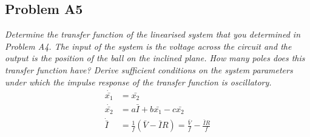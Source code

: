 \subsection*{Problem A5} \emph{Determine the transfer function of the linearised system that you determined in Problem A4. The input of the system is the voltage across the circuit and the output is the position of the ball on the inclined plane. How many poles does this transfer function have? Derive sufficient conditions on the system parameters under which the impulse response of the transfer function is oscillatory.}
    \begin{align}\nonumber
        \dot{\bar{x_1}} &= \bar{x_2}\\ \nonumber
        \dot{\bar{x_2}} &= a\bar{I} + b\bar{x_1} - c\bar{x_2}\\ \nonumber
        \dot{\bar{I}} &= \frac{1}{f}(\bar{V}-\bar{I}R)=\frac{\bar{V}}{f} - \frac{\bar{I}R}{f}\\ \nonumber
    \end{align}
    
